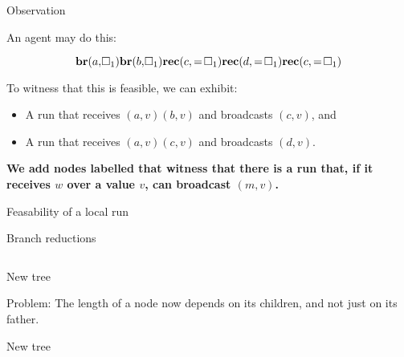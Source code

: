 \documentclass{beamer}
\newcommand{\br}{\mathbf{br}}
\newcommand{\rec}{\mathbf{rec}}
\newcommand{\reg}{\hspace{-0.5mm}\square}
\begin{document}
\begin{frame}{Observation}
	
	An agent may do this:
	
	\[ \br(a, \reg_1) \br(b, \reg_1) \rec(c, =\reg_1) \rec(d, =\reg_1) \rec(c, =\reg_1)\]
	\pause
	
	To witness that this is feasible, we can exhibit: 
	\begin{itemize}
		\item A run that receives $(a, v) (b, v)$ and broadcasts $(c,v)$, and
		
		\item A run that receives $(a,v) (c,v)$ and broadcasts $(d,v)$.
	\end{itemize}
\vspace{0.5cm}

	\pause
	\textbf{We add nodes labelled  that witness that there is a run that, if it receives $w$ over a value $v$, can broadcast $(m,v)$.}
\end{frame}

\begin{frame}{Feasability of a local run}
	
	
	
\end{frame}


\begin{frame}{Branch reductions}
	\begin{columns}
		\begin{column}{0.5\textwidth}
			
		\end{column}
		
		\begin{column}{0.5\textwidth}
			
		\end{column}
	\end{columns}
	
\end{frame}

\begin{frame}{New tree}
	
	
	Problem: The length of a node now depends on its  children, and not just on its father.
\end{frame}

\begin{frame}{New tree}
	
\end{frame}
\end{document}
